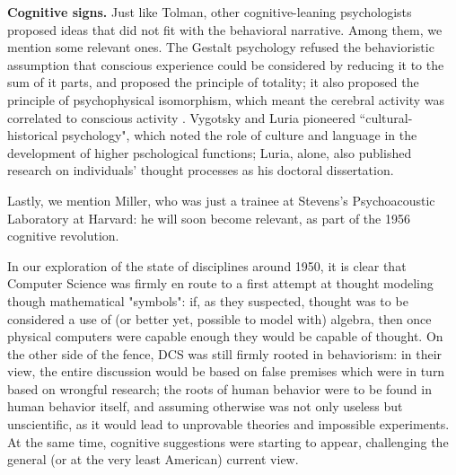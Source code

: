 \documentclass[../main.tex]{subfiles}
\begin{document}
\vspace{4pt}
\textbf{Cognitive signs.} Just like Tolman, other cognitive-leaning psychologists proposed ideas that did not fit with the behavioral narrative. Among them, we mention some relevant ones. The Gestalt psychology refused the behavioristic assumption that conscious experience could be considered by reducing it to the sum of it parts, and proposed the principle of totality; it also proposed the principle of psychophysical isomorphism, which meant the cerebral activity was correlated to conscious activity \cite{wagemansCenturyGestaltPsychology2012}. Vygotsky and Luria pioneered ``cultural-historical psychology", which noted the role of culture and language in the development of higher pschological functions; Luria, alone, also published research on individuals' thought processes as his doctoral dissertation.

Lastly, we mention Miller, who was just a trainee at Stevens's Psychoacoustic Laboratory at Harvard: he will soon become relevant, as part of the 1956 cognitive revolution.

\vspace{4pt}
In our exploration of the state of disciplines around 1950, it is clear that Computer Science was firmly en route to a first attempt at thought modeling though mathematical "symbols": if, as they suspected, thought was to be considered a use of (or better yet, possible to model with) algebra, then once physical computers were capable enough they would be capable of thought. On the other side of the fence, DCS was still firmly rooted in behaviorism: in their view, the entire discussion would be based on false premises which were in turn based on wrongful research; the roots of human behavior were to be found in human behavior itself, and assuming otherwise was not only useless but unscientific, as it would lead to unprovable theories and impossible experiments. At the same time, cognitive suggestions were starting to appear, challenging the general (or at the very least American) current view.
\end{document}
